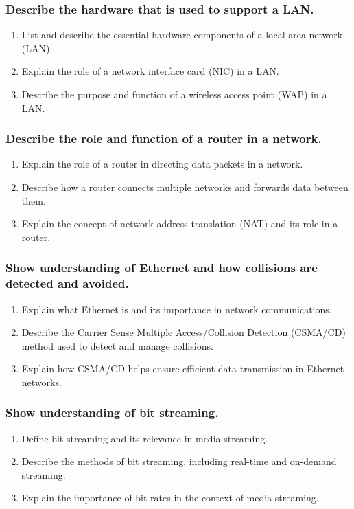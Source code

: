 \documentclass[a4paper]{article}
\begin{document}
\subsubsection{Describe the hardware that is used to support a LAN.}
\begin{enumerate}
  \item List and describe the essential hardware components of a local area network (LAN).
  \item Explain the role of a network interface card (NIC) in a LAN.
  \item Describe the purpose and function of a wireless access point (WAP) in a LAN.
\end{enumerate}

\subsubsection{Describe the role and function of a router in a network.}
\begin{enumerate}
  \item Explain the role of a router in directing data packets in a network.
  \item Describe how a router connects multiple networks and forwards data between them.
  \item Explain the concept of network address translation (NAT) and its role in a router.
\end{enumerate}

\subsubsection{Show understanding of Ethernet and how collisions are detected and avoided.}
\begin{enumerate}
  \item Explain what Ethernet is and its importance in network communications.
  \item Describe the Carrier Sense Multiple Access/Collision Detection (CSMA/CD) method used to detect and manage collisions.
  \item Explain how CSMA/CD helps ensure efficient data transmission in Ethernet networks.
\end{enumerate}

\subsubsection{Show understanding of bit streaming.}
\begin{enumerate}
  \item Define bit streaming and its relevance in media streaming.
  \item Describe the methods of bit streaming, including real-time and on-demand streaming.
  \item Explain the importance of bit rates in the context of media streaming.
\end{enumerate}
\end{document}
